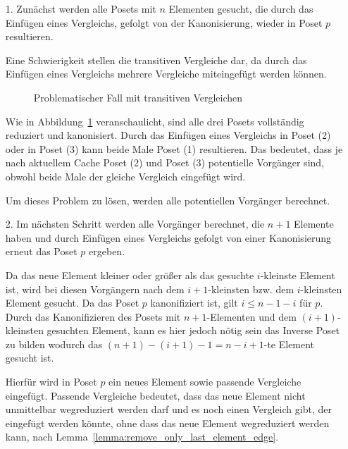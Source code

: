 \documentclass[10pt,journal,compsoc]{IEEEtran}
\begin{document}
\begin{itemize}
  \item[1.]
        Zunächst werden alle Posets mit $n$ Elementen gesucht, die durch das Einfügen eines Vergleichs, gefolgt von der Kanonisierung, wieder in Poset $p$ resultieren.

        Eine Schwierigkeit stellen die transitiven Vergleiche dar, da durch das Einfügen eines Vergleichs mehrere Vergleiche miteingefügt werden können.

        \begin{figure}
          \centering
          
          \caption{Problematischer Fall mit transitiven Vergleichen}
          \label{fig:backward_problematic}
        \end{figure}

        Wie in Abbildung~\ref{fig:backward_problematic} veranschaulicht, sind alle drei Posets vollständig reduziert und kanonisiert.
        Durch das Einfügen eines Vergleichs in Poset (2) oder in Poset (3) kann beide Male Poset (1) resultieren.
        Das bedeutet, dass je nach aktuellem Cache Poset (2) und Poset (3) potentielle Vorgänger sind, obwohl beide Male der gleiche Vergleich eingefügt wird.

        Um dieses Problem zu lösen, werden alle potentiellen Vorgänger berechnet.

  \item[2.]
        Im nächsten Schritt werden alle Vorgänger berechnet, die $n + 1$ Elemente haben und durch Einfügen eines Vergleichs gefolgt von einer Kanonisierung erneut das Poset $p$ ergeben.

        Da das neue Element kleiner oder größer als das gesuchte $i$-kleinste Element ist, wird bei diesen Vorgängern nach dem $i + 1$-kleinsten bzw. dem $i$-kleinsten Element gesucht.
        Da das Poset $p$ kanonifiziert ist, gilt $i \leq n - 1 - i$ für $p$.
        Durch das Kanonifizieren des Posets mit $n + 1$-Elementen und dem $(i + 1)$-kleinsten gesuchten Element, kann es hier jedoch nötig sein das Inverse Poset zu bilden wodurch das $(n + 1) - (i + 1) - 1 = n - i + 1$-te Element gesucht ist.

        Hierfür wird in Poset $p$ ein neues Element sowie passende Vergleiche eingefügt.
        Passende Vergleiche bedeutet, dass das neue Element nicht unmittelbar wegreduziert werden darf und es noch einen Vergleich gibt, der eingefügt werden könnte, ohne dass das neue Element wegreduziert werden kann, nach Lemma~\ref{lemma:remove_only_last_element_edge}.


\end{itemize}
\end{document}
